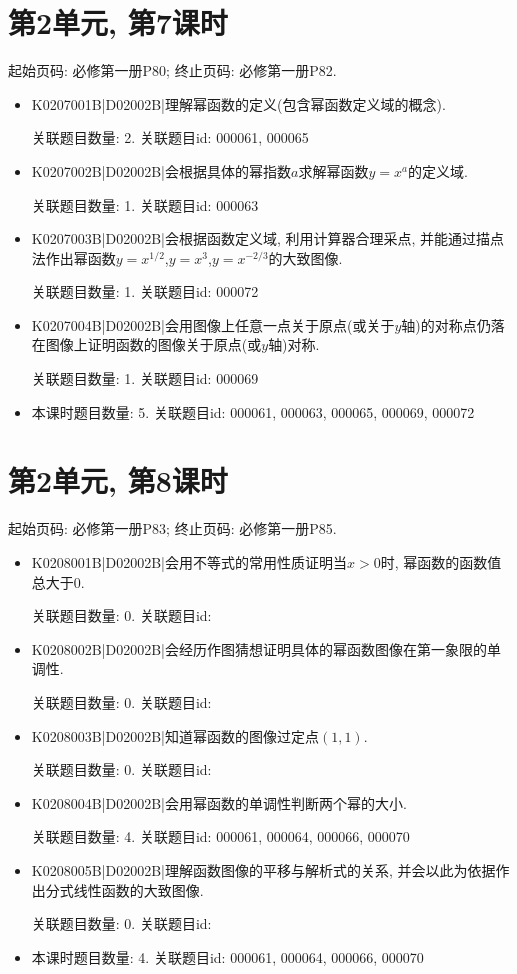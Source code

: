 \section*{第2单元, 第7课时}
起始页码: 必修第一册P80; 终止页码: 必修第一册P82.
\begin{itemize}
\item K0207001B|D02002B|理解幂函数的定义(包含幂函数定义域的概念).

关联题目数量: 2. 关联题目id: 000061, 000065

\item K0207002B|D02002B|会根据具体的幂指数$a$求解幂函数$y=x^{a}$的定义域.

关联题目数量: 1. 关联题目id: 000063

\item K0207003B|D02002B|会根据函数定义域, 利用计算器合理采点, 并能通过描点法作出幂函数$y=x^{1/2}$,$y=x^{3}$,$y=x^{-2/3}$的大致图像.

关联题目数量: 1. 关联题目id: 000072

\item K0207004B|D02002B|会用图像上任意一点关于原点(或关于$y$轴)的对称点仍落在图像上证明函数的图像关于原点(或$y$轴)对称.

关联题目数量: 1. 关联题目id: 000069

\item 本课时题目数量: 5. 关联题目id: 000061, 000063, 000065, 000069, 000072

\end{itemize}

\section*{第2单元, 第8课时}
起始页码: 必修第一册P83; 终止页码: 必修第一册P85.
\begin{itemize}
\item K0208001B|D02002B|会用不等式的常用性质证明当$x>0$时, 幂函数的函数值总大于$0$.

关联题目数量: 0. 关联题目id: 

\item K0208002B|D02002B|会经历作图猜想证明具体的幂函数图像在第一象限的单调性.

关联题目数量: 0. 关联题目id: 

\item K0208003B|D02002B|知道幂函数的图像过定点$(1,1)$.

关联题目数量: 0. 关联题目id: 

\item K0208004B|D02002B|会用幂函数的单调性判断两个幂的大小.

关联题目数量: 4. 关联题目id: 000061, 000064, 000066, 000070

\item K0208005B|D02002B|理解函数图像的平移与解析式的关系, 并会以此为依据作出分式线性函数的大致图像.

关联题目数量: 0. 关联题目id: 

\item 本课时题目数量: 4. 关联题目id: 000061, 000064, 000066, 000070

\end{itemize}

